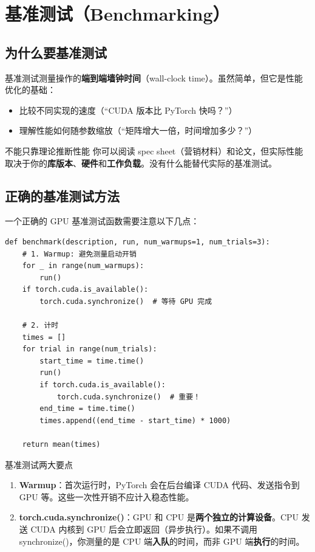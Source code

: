 \section{基准测试（Benchmarking）}

\subsection{为什么要基准测试}

基准测试测量操作的\textbf{端到端墙钟时间}（wall-clock time）。虽然简单，但它是性能优化的基础：

\begin{itemize}
    \item 比较不同实现的速度（``CUDA 版本比 PyTorch 快吗？''）
    \item 理解性能如何随参数缩放（``矩阵增大一倍，时间增加多少？''）
\end{itemize}

\begin{warningbox}{不能只靠理论推断性能}
你可以阅读 spec sheet（营销材料）和论文，但实际性能取决于你的\textbf{库版本}、\textbf{硬件}和\textbf{工作负载}。没有什么能替代实际的基准测试。
\end{warningbox}

\subsection{正确的基准测试方法}

一个正确的 GPU 基准测试函数需要注意以下几点：

\begin{lstlisting}[caption={基准测试函数模板（Python）}]
def benchmark(description, run, num_warmups=1, num_trials=3):
    # 1. Warmup: 避免测量启动开销
    for _ in range(num_warmups):
        run()
    if torch.cuda.is_available():
        torch.cuda.synchronize()  # 等待 GPU 完成

    # 2. 计时
    times = []
    for trial in range(num_trials):
        start_time = time.time()
        run()
        if torch.cuda.is_available():
            torch.cuda.synchronize()  # 重要！
        end_time = time.time()
        times.append((end_time - start_time) * 1000)

    return mean(times)
\end{lstlisting}

\begin{importantbox}{基准测试两大要点}
\begin{enumerate}
    \item \textbf{Warmup}：首次运行时，PyTorch 会在后台编译 CUDA 代码、发送指令到 GPU 等。这些一次性开销不应计入稳态性能。
    \item \textbf{torch.cuda.synchronize()}：GPU 和 CPU 是\textbf{两个独立的计算设备}。CPU 发送 CUDA 内核到 GPU 后会立即返回（异步执行）。如果不调用 synchronize()，你测量的是 CPU 端\textbf{入队}的时间，而非 GPU 端\textbf{执行}的时间。
\end{enumerate}
\end{importantbox}

